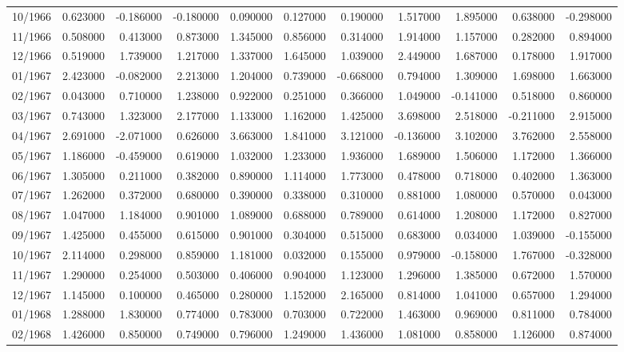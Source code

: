 \begin{tabular}{lrrrrrrrrrr}
10/1966 & 0.623000 & -0.186000 & -0.180000 & 0.090000 & 0.127000 & 0.190000 & 1.517000 & 1.895000 & 0.638000 & -0.298000 \\
11/1966 & 0.508000 & 0.413000 & 0.873000 & 1.345000 & 0.856000 & 0.314000 & 1.914000 & 1.157000 & 0.282000 & 0.894000 \\
12/1966 & 0.519000 & 1.739000 & 1.217000 & 1.337000 & 1.645000 & 1.039000 & 2.449000 & 1.687000 & 0.178000 & 1.917000 \\
01/1967 & 2.423000 & -0.082000 & 2.213000 & 1.204000 & 0.739000 & -0.668000 & 0.794000 & 1.309000 & 1.698000 & 1.663000 \\
02/1967 & 0.043000 & 0.710000 & 1.238000 & 0.922000 & 0.251000 & 0.366000 & 1.049000 & -0.141000 & 0.518000 & 0.860000 \\
03/1967 & 0.743000 & 1.323000 & 2.177000 & 1.133000 & 1.162000 & 1.425000 & 3.698000 & 2.518000 & -0.211000 & 2.915000 \\
04/1967 & 2.691000 & -2.071000 & 0.626000 & 3.663000 & 1.841000 & 3.121000 & -0.136000 & 3.102000 & 3.762000 & 2.558000 \\
05/1967 & 1.186000 & -0.459000 & 0.619000 & 1.032000 & 1.233000 & 1.936000 & 1.689000 & 1.506000 & 1.172000 & 1.366000 \\
06/1967 & 1.305000 & 0.211000 & 0.382000 & 0.890000 & 1.114000 & 1.773000 & 0.478000 & 0.718000 & 0.402000 & 1.363000 \\
07/1967 & 1.262000 & 0.372000 & 0.680000 & 0.390000 & 0.338000 & 0.310000 & 0.881000 & 1.080000 & 0.570000 & 0.043000 \\
08/1967 & 1.047000 & 1.184000 & 0.901000 & 1.089000 & 0.688000 & 0.789000 & 0.614000 & 1.208000 & 1.172000 & 0.827000 \\
09/1967 & 1.425000 & 0.455000 & 0.615000 & 0.901000 & 0.304000 & 0.515000 & 0.683000 & 0.034000 & 1.039000 & -0.155000 \\
10/1967 & 2.114000 & 0.298000 & 0.859000 & 1.181000 & 0.032000 & 0.155000 & 0.979000 & -0.158000 & 1.767000 & -0.328000 \\
11/1967 & 1.290000 & 0.254000 & 0.503000 & 0.406000 & 0.904000 & 1.123000 & 1.296000 & 1.385000 & 0.672000 & 1.570000 \\
12/1967 & 1.145000 & 0.100000 & 0.465000 & 0.280000 & 1.152000 & 2.165000 & 0.814000 & 1.041000 & 0.657000 & 1.294000 \\
01/1968 & 1.288000 & 1.830000 & 0.774000 & 0.783000 & 0.703000 & 0.722000 & 1.463000 & 0.969000 & 0.811000 & 0.784000 \\
02/1968 & 1.426000 & 0.850000 & 0.749000 & 0.796000 & 1.249000 & 1.436000 & 1.081000 & 0.858000 & 1.126000 & 0.874000 \\

\end{tabular}
